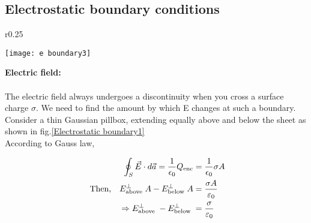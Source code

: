 \subsection{Electrostatic boundary conditions}
\begin{wrapfigure}{r}{0.25\textwidth}
	\begin{center}
		\texttt{[image: e boundary3]}
	\end{center}
	\caption{Electrostatic boundary}
	\label{Electrostatic boundary1}
\end{wrapfigure}
\textbf{Electric field:}\\\\
The electric field always undergoes a discontinuity when you cross a surface charge $\sigma$. We need to find the amount by which E changes at such a boundary.\\Consider a thin Gaussian pillbox, extending equally above and below the sheet as shown in fig.\ref{Electrostatic boundary1} \\
According to Gauss law,

\begin{align}
\oint_{S} \vec{E} \cdot d \vec{a}=\frac{1}{\epsilon_{0}} Q_{\mathrm{enc}}
&=\frac{1}{\epsilon_{0}} \sigma A \notag\\
\text{\ Then,}\quad  E_{\text {above }}^{\perp} A-E_{\text {below }}^{\perp} A&=\frac{\sigma A}{\varepsilon_{0}}\notag \\
\Rightarrow E_{\text {above }}^{\perp}-E_{\text {below }}^{\perp}&=\frac{\sigma}{\varepsilon_{0}}
\end{align}

